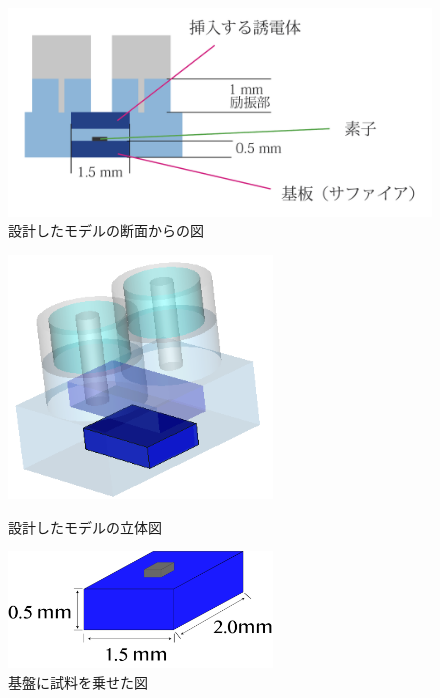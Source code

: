 \vspace{10 mm}

\begin{figure}[h]
  \begin{center}
    \includegraphics[width=12cm]{./image/newmodel.png}
    \caption{設計したモデルの断面からの図}
    \label{fig:Cavity}
  \end{center}
\end{figure}

\vspace{10 mm}

\begin{figure}[h]
 \begin{minipage}{0.5\hsize}
  \begin{center}
   \includegraphics[width=70mm]{./image/model73.png}
  \end{center}
  \caption{設計したモデルの立体図}
  \label{fig:one}
 \end{minipage}
 \begin{minipage}{0.5\hsize}
  \begin{center}
   \includegraphics[width=70mm]{./image/基板資料あり.png}
  \end{center}
  \caption{基盤に試料を乗せた図}
  \label{fig:two}
 \end{minipage}
\end{figure}

